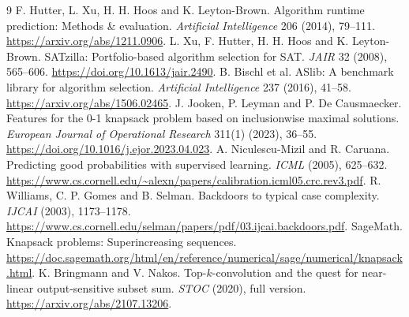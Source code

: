\documentclass[10pt,english]{article}
\begin{document}
\clearpage
\begin{thebibliography}{9}
\small
{} F. Hutter, L. Xu, H. H. Hoos and K. Leyton-Brown. Algorithm runtime prediction: Methods \& evaluation. \emph{Artificial Intelligence} 206 (2014), 79--111. \url{https://arxiv.org/abs/1211.0906}.
 L. Xu, F. Hutter, H. H. Hoos and K. Leyton-Brown. SATzilla: Portfolio-based algorithm selection for SAT. \emph{JAIR} 32 (2008), 565--606. \url{https://doi.org/10.1613/jair.2490}.
 B. Bischl et al. ASlib: A benchmark library for algorithm selection. \emph{Artificial Intelligence} 237 (2016), 41--58. \url{https://arxiv.org/abs/1506.02465}.
 J. Jooken, P. Leyman and P. De Causmaecker. Features for the 0-1 knapsack problem based on inclusionwise maximal solutions. \emph{European Journal of Operational Research} 311(1) (2023), 36--55. \url{https://doi.org/10.1016/j.ejor.2023.04.023}.
 A. Niculescu-Mizil and R. Caruana. Predicting good probabilities with supervised learning. \emph{ICML} (2005), 625--632. \url{https://www.cs.cornell.edu/~alexn/papers/calibration.icml05.crc.rev3.pdf}.
 R. Williams, C. P. Gomes and B. Selman. Backdoors to typical case complexity. \emph{IJCAI} (2003), 1173--1178. \url{https://www.cs.cornell.edu/selman/papers/pdf/03.ijcai.backdoors.pdf}.
 SageMath. Knapsack problems: Superincreasing sequences. \url{https://doc.sagemath.org/html/en/reference/numerical/sage/numerical/knapsack.html}.
 K. Bringmann and V. Nakos. Top-\(k\)-convolution and the quest for near-linear output-sensitive subset sum. \emph{STOC} (2020), full version. \url{https://arxiv.org/abs/2107.13206}.
\end{thebibliography}
\end{document}
